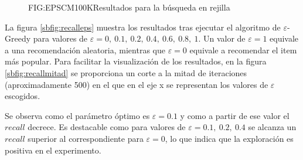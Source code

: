 \begin{figure}[Resultados de la búsqueda en rejilla para $\varepsilon$-Greedy]{FIG:EPSCM100K}{Resultados para la búsqueda en rejilla}
   \quad
\end{figure}



La figura \ref{sbfig:recalleps} muestra los resultados tras ejecutar el algoritmo de $\varepsilon$-Greedy para valores de $\varepsilon = 0,\  0.1,\ 0.2,\ 0.4,\ 0.6,\ 0.8,\ 1$. Un valor de $\varepsilon = 1$ equivale a una recomendación aleatoria, mientras que $\varepsilon = 0$ equivale a recomendar el item más popular. Para facilitar la visualización de los resultados, en la figura \ref{sbfig:recallmitad} se proporciona un corte a la mitad de iteraciones (aproximadamente 500) en el que en el eje x se representan los valores de $\varepsilon$ escogidos.

Se observa como el parámetro óptimo es $\varepsilon = 0.1$ y como a partir de ese valor el $recall$ decrece. Es destacable como para valores de $\varepsilon = 0.1,\ 0.2,\  0.4$ se alcanza un $recall$ superior al correspondiente para $\varepsilon = 0$, lo que indica que la exploración es positiva en el experimento.


